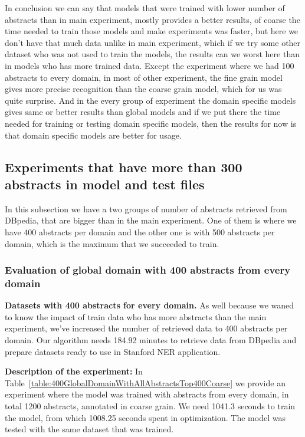 \documentclass[thesis=M,english]{FITthesis}[2018/05/30]
\begin{document}
In conclusion we can say that models that were trained with lower number of abstracts than in main experiment, mostly provides a better results, of coarse the time needed to train those models and make experiments was faster, but here we don't have that much data unlike in main experiment, which if we try some other dataset who was not used to train the models, the results can we worst here than in models who has more trained data. Except the experiment where we had 100 abstracts to every domain, in most of other experiment, the fine grain model gives more precise recognition than the coarse grain model, which for us was quite surprise. And in the every group of experiment the domain specific models gives same or better results than global models and if we put there the time needed for training or testing domain specific models, then the results for now is that domain specific models are better for usage. 

\subsection{Experiments that have more than 300 abstracts in model and test files}
In this subsection we have a two groups of number of abstracts retrieved from DBpedia, that are bigger than in the main experiment. One of them is where we have 400 abstracts per domain and the other one is with 500 abstracts per domain, which is the maximum that we succeeded to train.

\subsubsection{Evaluation of global domain with 400 abstracts from every domain }
\textbf{Datasets with 400 abstracts for every domain.} As well because we waned to know the impact of train data who has more abstracts than the main experiment, we've increased the number of retrieved data to 400 abstracts per domain. Our algorithm needs 184.92 minutes to retrieve data from DBpedia and prepare datasets ready to use in Stanford NER application.

\textbf{Description of the experiment:} In Table~\ref{table:400GlobalDomainWithAllAbstractsTop400Coarse} we provide an experiment where the model was trained with abstracts from every domain, in total 1200 abstracts, annotated in coarse grain. We need 1041.3 seconds to train the model, from which 1008.25 seconds spent in optimization. The model was tested with the same dataset that was trained.    
\end{document}
